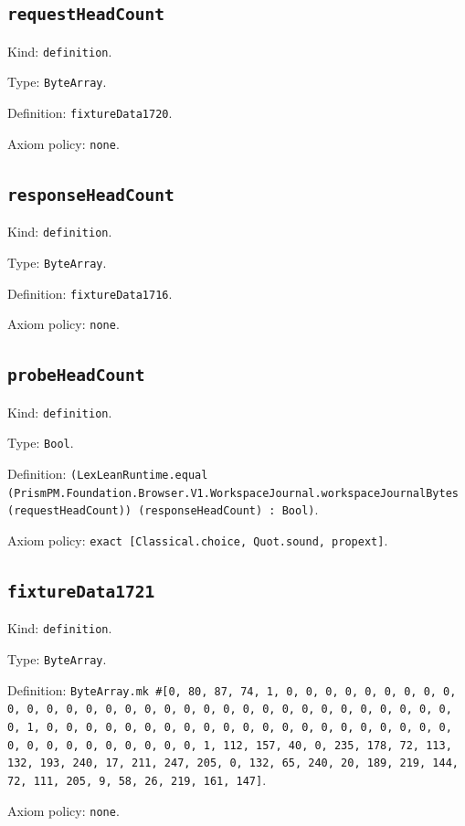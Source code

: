 \documentclass[11pt]{article}
\begin{document}
\subsection*{\texttt{requestHeadCount}}
\noindent Kind: \texttt{definition}.\par
\noindent Type: \texttt{ByteArray}.\par
\noindent Definition: \texttt{fixtureData1720}.\par
\noindent Axiom policy: \texttt{none}.\par
\subsection*{\texttt{responseHeadCount}}
\noindent Kind: \texttt{definition}.\par
\noindent Type: \texttt{ByteArray}.\par
\noindent Definition: \texttt{fixtureData1716}.\par
\noindent Axiom policy: \texttt{none}.\par
\subsection*{\texttt{probeHeadCount}}
\noindent Kind: \texttt{definition}.\par
\noindent Type: \texttt{Bool}.\par
\noindent Definition: \texttt{(LexLeanRuntime.equal (PrismPM.Foundation.Browser.V1.WorkspaceJournal.workspaceJournalBytes (requestHeadCount)) (responseHeadCount) : Bool)}.\par
\noindent Axiom policy: \texttt{exact [Classical.choice, Quot.sound, propext]}.\par
\subsection*{\texttt{fixtureData1721}}
\noindent Kind: \texttt{definition}.\par
\noindent Type: \texttt{ByteArray}.\par
\noindent Definition: \texttt{ByteArray.mk \#[0, 80, 87, 74, 1, 0, 0, 0, 0, 0, 0, 0, 0, 0, 0, 0, 0, 0, 0, 0, 0, 0, 0, 0, 0, 0, 0, 0, 0, 0, 0, 0, 0, 0, 0, 0, 0, 0, 1, 0, 0, 0, 0, 0, 0, 0, 0, 0, 0, 0, 0, 0, 0, 0, 0, 0, 0, 0, 0, 0, 0, 0, 0, 0, 0, 0, 0, 0, 0, 0, 1, 112, 157, 40, 0, 235, 178, 72, 113, 132, 193, 240, 17, 211, 247, 205, 0, 132, 65, 240, 20, 189, 219, 144, 72, 111, 205, 9, 58, 26, 219, 161, 147]}.\par
\noindent Axiom policy: \texttt{none}.\par
\end{document}
